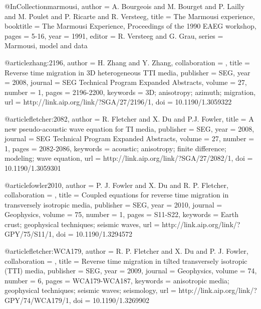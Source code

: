 @InCollection{marmousi,
  author =	 {A. Bourgeois and M. Bourget and P. Lailly and
                  M. Poulet and P. Ricarte and R. Versteeg},
  title =	 {The {M}armousi experience},
  booktitle =	 {The Marmousi Experience, Proceedings of the 1990
                  EAEG workshop},
  pages =	 {5-16},
  year =	 1991,
  editor =	 {R. Versteeg and G. Grau},
  series =	 {Marmousi, model and data}
}

@article{zhang:2196,
author = {H. Zhang and Y. Zhang},
collaboration = {},
title = {Reverse time migration in 3{D} heterogeneous {TTI} media},
publisher = {SEG},
year = {2008},
journal = {SEG Technical Program Expanded Abstracts},
volume = {27},
number = {1},
pages = {2196-2200},
keywords = {3{D}; anisotropy; azimuth; migration},
url = {http://link.aip.org/link/?SGA/27/2196/1},
doi = {10.1190/1.3059322}
}

@article{fletcher:2082,
  author =	 {R. Fletcher and X. Du and P.J. Fowler},
  title =	 {A new pseudo-acoustic wave equation for {TI} media},
  publisher =	 {SEG},
  year =	 2008,
  journal =	 {SEG Technical Program Expanded Abstracts},
  volume =	 27,
  number =	 1,
  pages =	 {2082-2086},
  keywords =	 {acoustic; anisotropy; finite difference; modeling;
                  wave equation},
  url =		 {http://link.aip.org/link/?SGA/27/2082/1},
  doi =		 {10.1190/1.3059301}
}




@article{fowler2010,
author = {P. J. Fowler and X. Du and R. P. Fletcher},
collaboration = {},
title = {Coupled equations for reverse time migration in transversely isotropic media},
publisher = {SEG},
year = {2010},
journal = {Geophysics},
volume = {75},
number = {1},
pages = {S11-S22},
keywords = {Earth crust; geophysical techniques; seismic waves},
url = {http://link.aip.org/link/?GPY/75/S11/1},
doi = {10.1190/1.3294572}
}







@article{fletcher:WCA179,
author = {R. P. Fletcher and X. Du and P. J. Fowler},
collaboration = {},
title = {Reverse time migration in tilted transversely isotropic (TTI) media},
publisher = {SEG},
year = {2009},
journal = {Geophysics},
volume = {74},
number = {6},
pages = {WCA179-WCA187},
keywords = {anisotropic media; geophysical techniques; seismic waves; seismology},
url = {http://link.aip.org/link/?GPY/74/WCA179/1},
doi = {10.1190/1.3269902}
}







